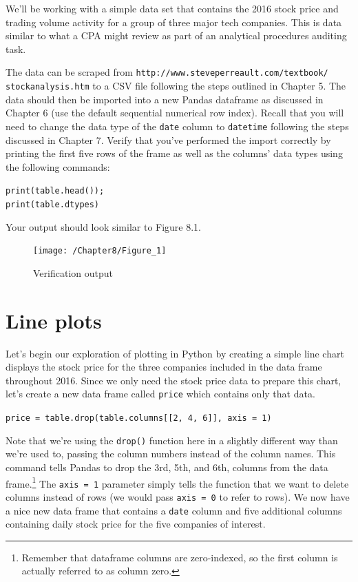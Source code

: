 \documentclass{book}
\begin{document}
We'll be working with a simple data set that contains the 2016 stock price and trading volume activity for a group of three major tech companies. This is data similar to what a CPA might review as part of an analytical procedures auditing task. 

The data can be scraped from \texttt{http://www.steveperreault.com/textbook/ stockanalysis.htm} to a CSV file following the steps outlined in Chapter 5. The data should then be imported into a new Pandas dataframe as discussed in Chapter 6 (use the default sequential numerical row index). Recall that you will need to change the data type of the \texttt{date} column to \texttt{datetime} following the steps discussed in Chapter 7. Verify that you've performed the import correctly by printing the first five rows of the frame as well as the columns' data types using the following commands:

\texttt{print(table.head());\\
	print(table.dtypes)}

Your output should look similar to Figure 8.1.

\begin{figure}[h]
	\caption{Verification output}
	\centering\texttt{[image: /Chapter8/Figure\_1]}
\end{figure}

\section{Line plots}

Let's begin our exploration of plotting in Python by creating a simple line chart displays the stock price for the three companies included in the data frame throughout 2016. Since we only need the stock price data to prepare this chart, let's create a new data frame called \texttt{price} which contains only that data.

\texttt{price = table.drop(table.columns[[2, 4, 6]], axis = 1)}

Note that we're using the \texttt{drop()} function here in a slightly different way than we're used to, passing the column numbers instead of the column names. This command tells Pandas to drop the 3rd, 5th, and 6th, columns from the data frame.\footnote{Remember that dataframe columns are zero-indexed, so the first column is actually referred to as column zero.} The \texttt{axis = 1} parameter simply tells the function that we want to delete columns instead of rows (we would pass \texttt{axis = 0} to refer to rows). We now have a nice new data frame that contains a \texttt{date} column and five additional columns containing daily stock price for the five companies of interest.
\end{document}
